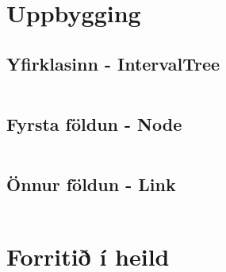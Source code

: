 \documentclass{article}
\begin{document}
\section {Uppbygging}
\subsection{Yfirklasinn - IntervalTree}
\inputminted{java}{Foll.java}

\subsection{Fyrsta földun - Node}
\inputminted{java}{Node.java}

\subsection{Önnur földun - Link}
\inputminted{java}{Link.java}

\pagebreak

\section {Forritið í heild}

\inputminted[mathescape,
               linenos,
               numbersep=10pt,
               gobble=0,
               frame=lines,
               framesep=2mm]{java}{../IntervalTree.java}
\end{document}
